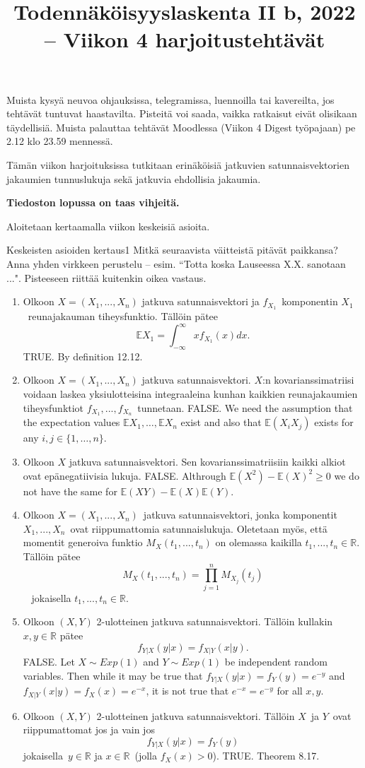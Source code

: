 \documentclass[11pt,a4paper]{amsart}
\title{Todennäköisyyslaskenta II b, 2022 -- Viikon 4 harjoitustehtävät}
\newcommand{\R}{\mathbb{R}}
\newcommand{\E}{\mathbb{E}}
\newcommand{\1}{\mathbf{1}}
\begin{document}
\maketitle

Muista kysyä neuvoa ohjauksissa, telegramissa, luennoilla tai kavereilta, jos tehtävät tuntuvat haastavilta. Pisteitä voi saada, vaikka ratkaisut eivät olisikaan täydellisiä.  Muista palauttaa tehtävät Moodlessa (Viikon 4 Digest työpajaan) pe 2.12 klo 23.59 mennessä.

\medskip 

Tämän viikon harjoituksissa tutkitaan erinäköisiä jatkuvien satunnaisvektorien jakaumien tunnuslukuja sekä jatkuvia ehdollisia jakaumia.

 {\bf Tiedoston lopussa on taas vihjeitä.}
\medskip 

Aloitetaan kertaamalla viikon keskeisiä asioita.
\begin{Exercises}{Keskeisten asioiden kertaus}{1}
Mitkä seuraavista väitteistä pitävät paikkansa? Anna yhden virkkeen perustelu -- esim. ``Totta koska Lauseessa X.X. sanotaan ...". Pisteeseen riittää kuitenkin oikea vastaus. 
\begin{enumerate}
\item Olkoon $X=(X_1,...,X_n)$ jatkuva satunnaisvektori ja $f_{X_1}$ komponentin $X_1$ reunajakauman tiheysfunktio. Tällöin pätee 
\[
\E X_1=\int_{-\infty}^\infty xf_{X_1}(x)dx.
\]
TRUE. By definition 12.12.
\item Olkoon $X=(X_1,...,X_n)$ jatkuva satunnaisvektori. $X$:n kovarianssimatriisi voidaan laskea yksiulotteisina integraaleina kunhan kaikkien reunajakaumien tiheysfunktiot $f_{X_1},...,f_{X_n}$ tunnetaan.
FALSE. We need the assumption that the expectation values $ \E X_1, \dots, \E X_{n}$ exist and also
that $ \E (X_{i} X_{j} )$ exists for any $ i,j \in \{ 1,\dots,n \} $.
\item Olkoon $X$ jatkuva satunnaisvektori. Sen kovarianssimatriisiin kaikki alkiot ovat epänegatiivisia lukuja.
FALSE. Althrough $ \E(X^2) - \E(X)^2 \geq 0$ we do not have the same for $ \E(XY) - \E (X) \E (Y)$.
\item Olkoon $X=(X_1,...,X_n)$ jatkuva satunnaisvektori, jonka komponentit $X_1,...,X_n$ ovat riippumattomia satunnaislukuja. Oletetaan myös, että momentit generoiva funktio $M_X(t_1,...,t_n)$ on olemassa kaikilla $t_1,...,t_n\in \R$. Tällöin pätee 
\[
M_X(t_1,...,t_n)=\prod_{j=1}^n M_{X_j}(t_j)
\] 
jokaisella $t_1,...,t_n\in \R$.

\item Olkoon $(X,Y)$ 2-ulotteinen jatkuva satunnaisvektori. Tällöin kullakin $x,y\in \R$ pätee
\[
f_{Y|X}(y|x)=f_{X|Y}(x|y).
\]
FALSE. Let $ X \sim Exp(1)$ and $ Y \sim Exp(1)$ be independent random variables. Then while it may
be true that $ f_{Y|X} (y|x) = f_{Y} (y) = e^{-y}$ and $ f_{X|Y} (x|y) = f_{X} (x) = e^{-x} $, it is
not true that $ e^{-x} = e^{-y} $ for all $ x, y $.
\item Olkoon $(X,Y)$ 2-ulotteinen jatkuva satunnaisvektori. Tällöin $X$ ja $Y$ ovat riippumattomat jos ja vain jos 
\[
f_{Y|X}(y|x)=f_Y(y)
\]
jokaisella $y\in \R$ ja $x\in \R$ (jolla $f_X(x)>0$).
TRUE. Theorem 8.17.
\end{enumerate}
\end{Exercises}
\end{document}
